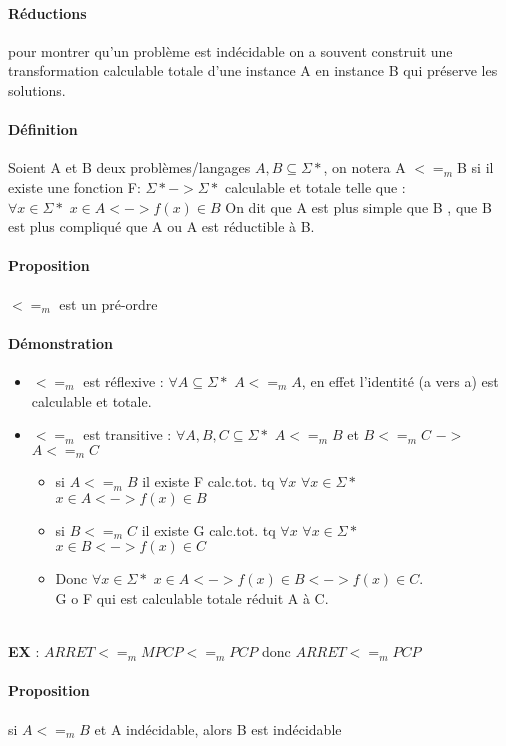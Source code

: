 \documentclass{article}
\begin{document}
{{\paragraph{Réductions} pour montrer qu'un problème est indécidable on a souvent construit une transformation calculable totale d'une instance A en instance B qui préserve les solutions.
\paragraph{Définition} Soient A et B deux problèmes/langages $ A,B\subseteq \Sigma*$, on notera A $<=_{m}$B si il existe une fonction F:  $\Sigma* -> \Sigma*$ calculable et totale telle que : \\$\forall x \in \Sigma*$  $x \in A <-> f(x) \in B$
On dit que A est plus simple que B , que B est plus compliqué que A ou A est réductible à B.
\paragraph{Proposition} $<=_{m}$ est un pré-ordre
\paragraph{Démonstration} 
\begin{itemize}
\item $<=_{m}$ est réflexive : $\forall A \subseteq \Sigma*$ $A <=_{m} A$, en effet l'identité (a vers a) est calculable et totale.
\item $<=_{m}$ est transitive : $\forall A,B,C \subseteq \Sigma*$  $A<=_{m}B$ et $B<=_{m}C$ $->$ $A<=_{m}C$
\begin{itemize}
\item si $A<=_{m}B$ il existe F calc.tot. tq $\forall x$ $\forall x \in \Sigma*$  $x \in A <-> f(x) \in B$

\item si $B<=_{m}C$ il existe G calc.tot. tq $\forall x$ $\forall x \in \Sigma*$  $x \in B <-> f(x) \in C$
\item Donc $\forall x \in \Sigma*$ $x \in A <-> f(x) \in B <-> f(x) \in C$.\\G o F qui est calculable totale réduit A à C.\\\\

\end{itemize}
\end{itemize}

\textbf{EX} : $ARRET<=_{m}MPCP<=_{m}PCP$ donc $ARRET<=_{m}PCP$ 
\paragraph{Proposition} si $A<=_{m}B$ et A indécidable, alors B est indécidable
}}
\end{document}
